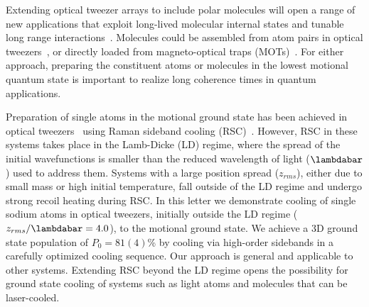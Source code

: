 \documentclass[aps,prl,twocolumn,groupedaddress]{revtex4-1}
\begin{document}
Extending optical tweezer arrays to include polar molecules will open a range of
new applications that exploit long-lived molecular internal states
and tunable long range interactions~\cite{DeMille2002,Gorshkov2011,Yan2013}.
Molecules could be assembled from atom pairs in optical tweezers~\cite{Liu2017},
or directly loaded from magneto-optical traps
(MOTs)~\cite{Barry2014,Truppe2017SubDoppler,Anderegg2017}.
For either approach, preparing the constituent atoms or molecules in the lowest motional
quantum state is important to realize long coherence times in quantum applications.

Preparation of single atoms in the motional ground state has been achieved in optical tweezers~\cite{Kaufman2012,Thompson2013,Liu2017,Robens2017}
 using Raman sideband cooling (RSC)~\cite{Monroe1995,Kerman2000,Han2000}.
However, RSC in these systems takes place in the Lamb-Dicke (LD) regime, where
the spread of the initial wavefunctions is smaller than the reduced wavelength of light ($\lambdabar$)
used to address them.
Systems with a large position spread ($z_{rms}$), either due to small mass or high initial temperature,
fall outside of the LD regime and undergo strong recoil heating during RSC.
In this letter we demonstrate cooling of single sodium atoms in optical tweezers,
initially outside the LD regime ($z_{rms}/\lambdabar=4.0$), to the motional ground state.
We achieve a 3D ground state population of $P_0=81(4)$\% by cooling via
 high-order sidebands in a carefully optimized cooling sequence.
Our approach is general and applicable to %
other systems. Extending RSC beyond the LD regime opens the possibility
for ground state cooling of systems such as light atoms and %
molecules that can be laser-cooled.
\end{document}
